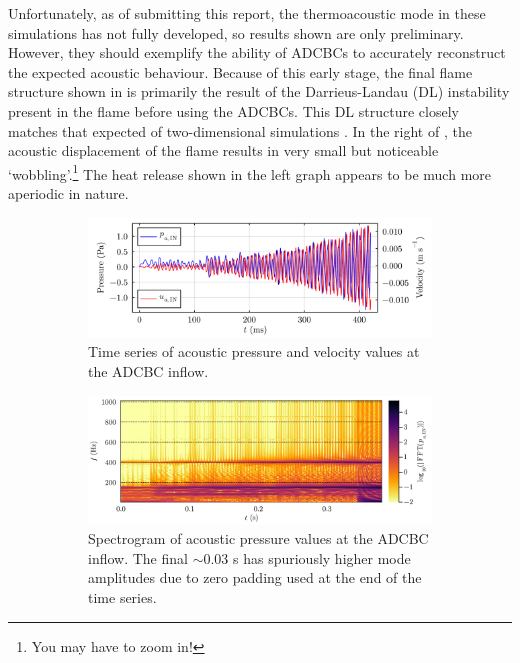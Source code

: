 Unfortunately, as of submitting this report, the thermoacoustic mode in these simulations has not fully developed, so results shown are only preliminary. However, they should exemplify the ability of ADCBCs to accurately reconstruct the expected acoustic behaviour. Because of this early stage, the final flame structure shown in  is primarily the result of the Darrieus-Landau (DL) instability present in the flame before using the ADCBCs. This DL structure closely matches that expected of two-dimensional simulations \cite{creta2011StrainRateEffects}. In the right of , the acoustic displacement of the flame results in very small but noticeable `wobbling'.\footnote{You may have to zoom in!} The heat release shown in the left graph appears to be much more aperiodic in nature.


\begin{figure}[t]
\begin{subfigure}{0.99\textwidth}
\centering
\includegraphics[scale=0.35]{assets/graphs/2mmx1m_still_pu.pdf}
\caption{Time series of acoustic pressure and velocity values at the ADCBC inflow.}
\label{fig:2mmx1m_still_pu}
\end{subfigure}

\vspace*{0.5em}

\begin{subfigure}{0.99\textwidth}
\centering
\includegraphics[scale=0.35]{assets/graphs/2mmx1m_still_spec2.pdf}
\caption{Spectrogram of acoustic pressure values at the ADCBC inflow. The final $\sim$0.03 s has spuriously higher mode amplitudes due to zero padding used at the end of the time series.}
\label{fig:spectrogram}
\end{subfigure}
\caption{}
\label{fig:in-ac}
\end{figure}

